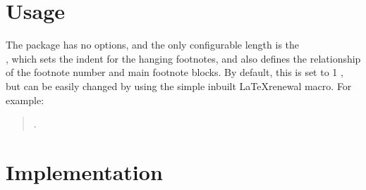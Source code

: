 \documentclass[12pt]{article}
\begin{document}
\section{Usage}
The package has no options, and the only configurable length is the \\\texttt{\fnindent}, which sets the indent for the hanging footnotes, and also defines the relationship of the footnote number and main footnote blocks.  By default, this is set to 1 , but can be easily changed by using the simple inbuilt \LaTeX renewal macro. For example:
\begin{quote}
 \texttt{\renewcommand{\fnindent}{1.25em}}.
\end{quote}
\section{Implementation}
\end{document}
